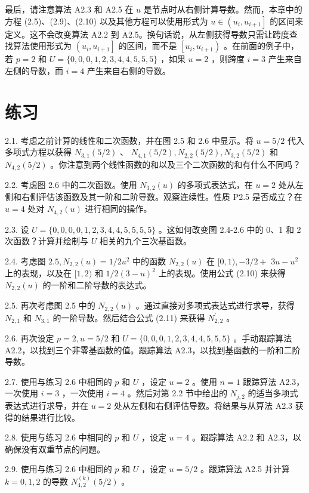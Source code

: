 \documentclass[../main.tex]{subfiles}
\begin{document}
最后，请注意算法 A2.3 和 A2.5 在 \(u\) 是节点时从右侧计算导数。然而，本章中的方程 (2.5)、(2.9)、(2.10) 以及其他方程可以使用形式为 \(u \in  \left( {{u}_{i},{u}_{i + 1}}\right\rbrack\) 的区间来定义。这不会改变算法 A2.2 到 A2.5。换句话说，从左侧获得导数只需让跨度查找算法使用形式为 \(\left( {{u}_{i},{u}_{i + 1}}\right\rbrack\) 的区间，而不是 \(\left\lbrack  {{u}_{i},{u}_{i + 1}}\right)\) 。在前面的例子中，若 \(p = 2\) 和 \(U = \{ 0,0,0,1,2,3,4,4,5,5,5\}\) ，如果 \(u = 2\) ，则跨度 \(i = 3\) 产生来自左侧的导数，而 \(i = 4\) 产生来自右侧的导数。

\section*{练习}

2.1. 考虑之前计算的线性和二次函数，并在图 2.5 和 2.6 中显示。将 \(u = 5/2\) 代入多项式方程以获得 \({N}_{3,1}\left( {5/2}\right)\) 、 \({N}_{4,1}\left( {5/2}\right) ,{N}_{2,2}\left( {5/2}\right) ,{N}_{3,2}\left( {5/2}\right)\) 和 \({N}_{4,2}\left( {5/2}\right)\) 。你注意到两个线性函数的和以及三个二次函数的和有什么不同吗？

2.2. 考虑图 2.6 中的二次函数。使用 \({N}_{3,2}\left( u\right)\) 的多项式表达式，在 \(u = 2\) 处从左侧和右侧评估该函数及其一阶和二阶导数。观察连续性。性质 P2.5 是否成立？在 \(u = 4\) 处对 \({N}_{4,2}\left( u\right)\) 进行相同的操作。

2.3. 设 \(U = \{ 0,0,0,0,1,2,3,4,4,5,5,5,5\}\) 。这如何改变图 2.4-2.6 中的 0、1 和 2 次函数？计算并绘制与 \(U\) 相关的九个三次基函数。

2.4. 考虑图 \({2.5},{N}_{2,2}\left( u\right)  = 1/2{u}^{2}\) 中的函数 \({N}_{2,2}\left( u\right)\) 在 \(\lbrack 0,1), - 3/2 +\)  \({3u} - {u}^{2}\) 上的表现，以及在 \(\lbrack 1,2)\) 和 \(1/2{\left( 3 - u\right) }^{2}\) 上的表现。使用公式 (2.10) 来获得 \({N}_{2,2}\left( u\right)\) 的一阶和二阶导数的表达式。

2.5. 再次考虑图 2.5 中的 \({N}_{2,2}\left( u\right)\) 。通过直接对多项式表达式进行求导，获得 \({N}_{2,1}\) 和 \({N}_{3,1}\) 的一阶导数。然后结合公式 (2.11) 来获得 \({N}_{2,2}^{\prime }\) 。

2.6. 再次设定 \(p = 2,u = 5/2\) 和 \(U = \{ 0,0,0,1,2,3,4,4,5,5,5\}\) 。手动跟踪算法 A2.2，以找到三个非零基函数的值。跟踪算法 A2.3，以找到基函数的一阶和二阶导数。

2.7. 使用与练习 2.6 中相同的 \(p\) 和 \(U\) ，设定 \(u = 2\) 。使用 \(n = 1\) 跟踪算法 A2.3，一次使用 \(i = 3\) ，一次使用 \(i = 4\) 。然后对第 2.2 节中给出的 \({N}_{j,2}\) 的适当多项式表达式进行求导，并在 \(u = 2\) 处从左侧和右侧评估导数。将结果与从算法 A2.3 获得的结果进行比较。

2.8. 使用与练习 2.6 中相同的 \(p\) 和 \(U\) ，设定 \(u = 4\) 。跟踪算法 A2.2 和 A2.3，以确保没有双重节点的问题。

2.9. 使用与练习 2.6 中相同的 \(p\) 和 \(U\) ，设定 \(u = 5/2\) 。跟踪算法 A2.5 并计算 \(k = 0,1,2\) 的导数 \({N}_{4,2}^{\left( k\right) }\left( {5/2}\right)\) 。



\clearpage
\end{document}
